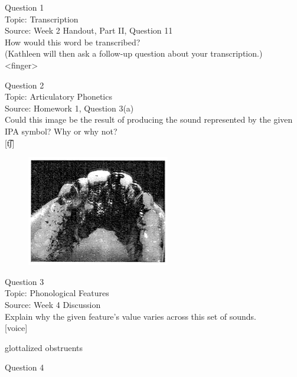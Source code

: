 \documentclass[12pt]{article}
\begin{document}
{\large Question 1}\\

Topic: Transcription\\
Source: Week 2 Handout, Part II, Question 11\\

How would this word be transcribed?\\ (Kathleen will then ask a follow-up question about your transcription.)\\

<finger>


\newpage

{\large Question 2}\\

Topic: Articulatory Phonetics\\
Source: Homework 1, Question 3(a)\\

Could this image be the result of producing the sound represented by the given IPA symbol? Why or why not?\\

{[t͡ʃ]}

\begin{figure}[H]
\includegraphics{../images/staticpalatography_stop.png}
\end{figure}

\newpage

{\large Question 3}\\

Topic: Phonological Features\\
Source: Week 4 Discussion\\

Explain why the given feature's value varies across this set of sounds.\\

{[voice]}

glottalized obstruents


\newpage

{\large Question 4}\\
\end{document}
